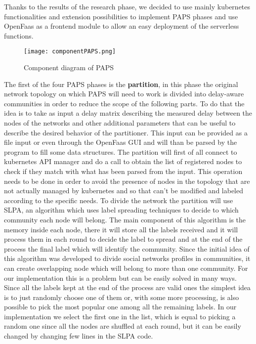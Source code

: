 Thanks to the results of the research phase, we decided to use mainly kubernetes functionalities
and extension possibilities to implement PAPS phases and use OpenFaas as a frontend module to 
allow an easy deployment of the serverless functions.
\begin{figure}[h]
    \texttt{[image: componentPAPS.png]}
    \label{fig:component}
    \caption{Component diagram of PAPS}
\end{figure}

The first of the four PAPS phases is the \textbf{partition}, in this phase the original 
network topology on which PAPS will need to work is divided into delay-aware communities in 
order to reduce the scope of the following parts. To do that the idea is to take as input a 
delay matrix describing the measured delay between the nodes of the networks and other 
additional parameters that can be useful to describe the desired behavior of the partitioner.
This input can be provided as a file input or even through the OpenFaas GUI and will than be
parsed by the program to fill some data structures. The partition will first of all connect to 
kubernetes API manager and do a call to obtain the list of registered nodes to check if they 
match with what has been parsed from the input. This operation needs to be done in order to
avoid the presence of nodes in the topology that are not actually managed by kubernetes and 
so that can't be modified and labeled according to the specific needs. 
To divide the network the partition will use SLPA, an algorithm which uses label spreading 
techniques to decide to which community each node will belong. The main component of this 
algorithm is the memory inside each node, there it will store all the labels received and 
it will process them in each round to decide the label to spread and at the end of the 
process the final label which will identify the community. Since the initial idea of this 
algorithm was developed to divide social networks profiles in communities, it can create 
overlapping node which will belong to more than one community. 
For our implementation this
is a problem but can be easily solved in many ways. Since all the labels kept at the end 
of the process are valid ones the simplest idea is to just randomly choose one of them or,
with some more processing, is also possible to pick the most popular one among all the 
remaining labels. In our implementation we select the first one in the list, which is 
equal to picking a random one since all the nodes are shuffled at each round, but it can 
be easily changed by changing few lines in the SLPA code.

